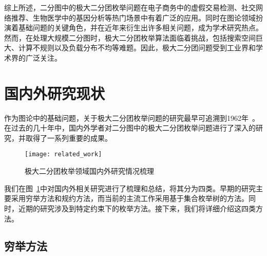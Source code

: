 综上所述，二分图中的极大二分团枚举问题在电子商务中的虚假交易检测、社交网络推荐、生物医学中的基因分析等热门场景中有着广泛的应用。同时在图论领域扮演着基础问题的关键角色，并在近年来衍生出许多相关问题，成为学术研究热点。然而，在处理大规模二分图时，极大二分团枚举算法面临着挑战，包括搜索空间巨大、计算不规则以及负载分布不均等难题。因此，极大二分团问题受到工业界和学术界的广泛关注。






\section{国内外研究现状}
\label{sec:related}

作为图论中的基础问题，关于极大二分团枚举问题的研究最早可追溯到1962年~\cite{MBE62}。在过去的几十年中，国内外学者对二分图中的极大二分团枚举问题进行了深入的研究，并取得了一系列重要的成果。

\begin{figure} [H]
  \centering
  \vspace{0.2in}
  \texttt{[image: related\_work]}
  \vspace{0.1in}
  \caption{极大二分团枚举领域国内外研究情况梳理}
  \label{fig:related_work}
\end{figure}

我们在图~\ref{fig:related_work}中对国内外相关研究进行了梳理和总结，将其分为四类。早期的研究主要采用穷举方法和规约方法，而当前的主流工作采用基于集合枚举树的方法。同时，近期的研究涉及到特定约束下的枚举方法。接下来，我们将详细介绍这四类方法。


\subsection{穷举方法}

